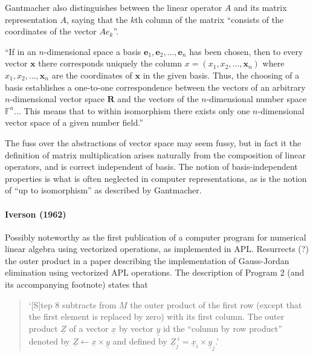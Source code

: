 Gantmacher also distinguishes \cite[pp. 54-56]{Gantmacher1960} between the linear operator $A$ and its matrix representation $A$, saying that the $k$th column of the matrix ``consists of the coordinates of the vector $Ae_k$''.

``If in an $n$-dimensional space a basis $\mathbf e_1, \mathbf e_2, \dots, \mathbf e_n$ has been chosen, then to every vector $\mathbf x$ there corresponds uniquely the column $x = (x_1, x_2, \dots, \mathbf x_n)$ where $x_1, x_2, \dots, \mathbf x_n$ are the coordinates of $\mathbf x$ in the given basis. Thus, the choosing of a basis establishes a one-to-one correspondence between the vectors of an arbitrary $n$-dimensional vector space $\mathbf R$ and the vectors of the $n$-dimensional number space $\mathbb F^n$... This means that to within isomorphism there exists only one $n$-dimensional vector space of a given number field.''

The fuss over the abstractions of vector space may seem fussy, but in fact it the definition of matrix multiplication arises naturally from the composition of linear operators, and is correct independent of basis. The notion of basis-independent properties is what is often neglected in computer representations, as is the notion of ``up to isomorphism'' as described by Gantmacher.



\paragraph{Iverson (1962)~\cite{Iverson1962}}

Possibly noteworthy as the first publication of a computer program for numerical linear algebra using vectorized operations, as implemented in APL.
Resurrects (?) the outer product in a paper describing the implementation of Gauss-Jordan elimination using vectorized APL operations. The description of Program 2 (and its accompanying footnote) states that

\begin{quote}
`[S]tep 8 subtracts from $\underline{\textit{M}}$ the outer product of the first row (except that the first element is replaced by zero) with its first column. The outer product $\underline{\textit{Z}}$ of a vector $\underline{\textit{x}}$ by vector $\underline{\textit{y}}$ id the ``column by row product'' denoted by $\underline{\textit{Z}} \leftarrow \underline{\textit{x}} \times \underline{\textit{y}}$ and defined by $\underline{\textit{Z}}^{\; i}_j = \underline{\textit{x}}_i \times \underline{\textit{y}}_j$.'
\end{quote}

